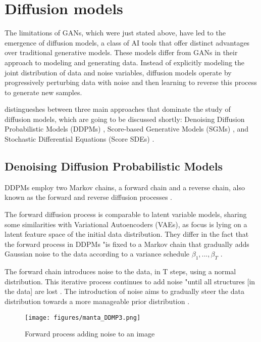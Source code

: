 \section{Diffusion models}
\label{diffusion Models}

The limitations of GANs, which were just stated above, have led to the emergence of diffusion models, a class of AI tools that offer distinct advantages over traditional generative models. These models differ from GANs in their approach to modeling and generating data.  Instead of explicitly modeling the joint distribution of data and noise variables, diffusion models operate by progressively perturbing data with noise and then learning to reverse this process to generate new samples.

\citeauthor{yangdiffusionSummary} distingueshes between three main approaches that dominate the study of diffusion models, which are going to be discussed shortly: Denoising Diffusion Probabilistic Models (DDPMs) \citep{hoDDPMs,sohlDDPM}, Score-based Generative Models (SGMs) \citep{song2019SGM}, and Stochastic Differential Equations (Score SDEs) \citep{song2020score, song2021maximum}.

\subsection{Denoising Diffusion Probabilistic Models}
DDPMs employ two Markov chains, a forward chain and a reverse chain, also known as the forward and reverse diffusion processes \citep{sohlDDPM}. 

The forward diffusion process is comparable to latent variable models, sharing some similarities with Variational Autoencoders (VAEs), as focus is lying on a latent feature space of the initial data distribution. They differ in the fact that the forward process in DDPMs "is fixed to a Markov chain that gradually adds Gaussian noise to the data according to a variance schedule \(\beta_1, ..., \beta_T \) \cite{hoDDPMs}.


The forward chain introduces noise to the data, in T steps, using a normal distribution. This iterative process continues to add noise "until all structures [in the data] are lost \citep{yangdiffusionSummary}. The introduction of noise aims to gradually steer the data distribution towards a more manageable prior distribution \citep{yangdiffusionSummary, pooleDreamfusion}. 

\begin{figure}[ht]
\centering
  \texttt{[image: figures/manta\_DDMP3.png]}
  \caption{Forward process adding noise to an image}
  \label{fig:figureDDPM}
\end{figure}

